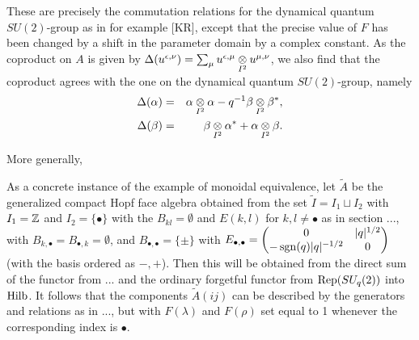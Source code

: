 These are precisely the commutation relations for the dynamical quantum $SU(2)$-group as in for example [KR], except that the precise value of $F$ has been changed by a shift in the parameter domain by a complex constant. As the coproduct on $A$ is given by $\Delta(u^{\epsilon,\nu}) = \sum_{\mu} u^{\epsilon,\mu}\underset{I^2}{\otimes} u^{\mu,\nu}$, we also find that the coproduct agrees with the one on the dynamical quantum $SU(2)$-group, namely \begin{eqnarray*} \Delta(\alpha) &=& \alpha\underset{I^2}{\otimes} \alpha - q^{-1}\beta\underset{I^2}{\otimes} \beta^*,\\ \Delta(\beta) &=& \beta\underset{I^2}{\otimes} \alpha^* +\alpha\underset{I^2}{\otimes} \beta.\end{eqnarray*}

More generally, 

As a concrete instance of the example of monoidal equivalence, let $\tilde{A}$ be the generalized compact Hopf face algebra obtained from the set $\tilde{I} =I_1\sqcup I_2$ with $I_1= \mathbb{Z}$ and $I_2= \{\bullet\}$ with the $B_{kl} =\emptyset$ and $E(k,l)$ for $k,l\neq \bullet$ as in section ..., with $B_{k,\bullet} = B_{\bullet,k}= \emptyset$, and $B_{\bullet,\bullet} = \{\pm\}$ with $E_{\bullet,\bullet} = \begin{pmatrix} 0 & |q|^{1/2} \\ -\operatorname{\mathrm{sgn}}(q)|q|^{-1/2}&0\end{pmatrix}$ (with the basis ordered as $-,+$). Then this will be obtained from the direct sum of the functor from ... and the ordinary forgetful functor from $\mathrm{Rep}(SU_q(2))$ into $\mathrm{Hilb}$. It follows that the components $\tilde{A}(ij)$ can be described by the generators and relations as in ..., but with $F(\lambda)$ and $F(\rho)$ set equal to 1 whenever the corresponding index is $\bullet$.





